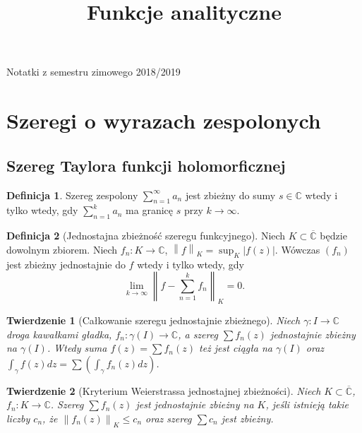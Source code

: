 \documentclass[11pt]{article}
\title{Funkcje analityczne}
\newcommand{\abs}[1]{\left|#1\right|} %
\newcommand{\norm}[1]{\left\lVert#1\right\rVert} %
\newcommand{\extcomplex}{\overline{\mathbb{C}}} %
\theoremstyle{plain}
\newtheorem*{theorem}{Twierdzenie}
\theoremstyle{definition}
\newtheorem*{definition}{Definicja}
\theoremstyle{remark}
\begin{document}
{\huge\bfseries\@title\par}
\vspace{0.1cm}
{\Large Notatki z semestru zimowego 2018/2019\par}


\section{Szeregi o wyrazach zespolonych}

\subsection{Szereg Taylora funkcji holomorficznej}

\begin{definition}
  Szereg zespolony $\sum_{n=1}^{\infty} a_{n}$ jest zbieżny do sumy $ s \in \mathbb{C} $ wtedy i tylko wtedy, gdy $ \sum_{n=1}^{k} a_{n} $ ma granicę $ s $ przy $ k\to\infty $.
\end{definition}

\begin{definition}[Jednostajna zbieżność szeregu funkcyjnego]
  Niech $ K \subset \extcomplex $ będzie dowolnym zbiorem. Niech $ f_{n} \colon K \to \mathbb{C} $, $ \norm{f}_{K} = \sup_{K}\abs{f(z)} $. Wówczas $ (f_{n}) $ jest zbieżny jednostajnie do $ f $ wtedy i tylko wtedy, gdy
  $$ \lim_{k\to\infty} \norm{f - \sum_{n=1}^{k} f_{n}}_{K} = 0. $$
\end{definition}

\begin{theorem}[Całkowanie szeregu jednostajnie zbieżnego]
  Niech $ \gamma \colon I \to \mathbb{C} $ droga kawałkami gładka, $ f_{n} \colon \gamma(I) \to \mathbb{C} $, a szereg $ \sum f_{n}(z) $ jednostajnie zbieżny na $ \gamma(I) $. Wtedy suma $ f(z) = \sum f_{n}(z) $ też jest ciągła na $ \gamma(I) $ oraz $ \int_{\gamma} f(z) dz = \sum (\int_{\gamma} f_{n}(z) dz) $.
\end{theorem}

\begin{theorem}[Kryterium Weierstrassa jednostajnej zbieżności]
  Niech $ K \subset \extcomplex $, $ f_{n} \colon K \to \mathbb{C} $. Szereg $ \sum f_{n}(z) $ jest jednostajnie zbieżny na $ K $, jeśli istnieją takie liczby $ c_{n} $, że $ \norm{f_n(z)}_K \leq c_{n} $ oraz szereg $ \sum c_{n} $ jest zbieżny.
\end{theorem}
\end{document}
